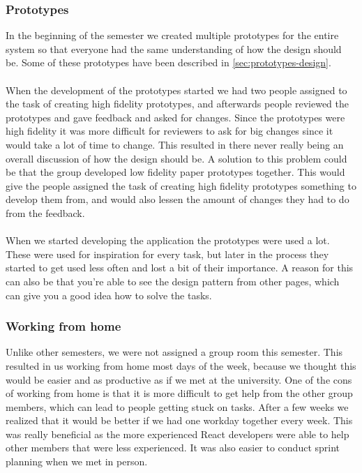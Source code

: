 \subsubsection{Prototypes}
In the beginning of the semester we created multiple prototypes for the entire system so that everyone had the same understanding of how the design should be.
Some of these prototypes have been described in \autoref{sec:prototypes-design}.
\\\\
When the development of the prototypes started we had two people assigned to the task of creating high fidelity prototypes, and afterwards people reviewed the prototypes and gave feedback and asked for changes.
Since the prototypes were high fidelity it was more difficult for reviewers to ask for big changes since it would take a lot of time to change.
This resulted in there never really being an overall discussion of how the design should be.
A solution to this problem could be that the group developed low fidelity paper prototypes together. 
This would give the people assigned the task of creating high fidelity prototypes something to develop them from, and would also lessen the amount of changes they had to do from the feedback.
\\\\
When we started developing the application the prototypes were used a lot.
These were used for inspiration for every task, but later in the process they started to get used less often and lost a bit of their importance.
A reason for this can also be that you're able to see the design pattern from other pages, which can give you a good idea how to solve the tasks.

\subsubsection{Working from home}
Unlike other semesters, we were not assigned a group room this semester.
This resulted in us working from home most days of the week, because we thought this would be easier and as productive as if we met at the university.
One of the cons of working from home is that it is more difficult to get help from the other group members, which can lead to people getting stuck on tasks.
After a few weeks we realized that it would be better if we had one workday together every week.
This was really beneficial as the more experienced React developers were able to help other members that were less experienced.
It was also easier to conduct sprint planning when we met in person.

